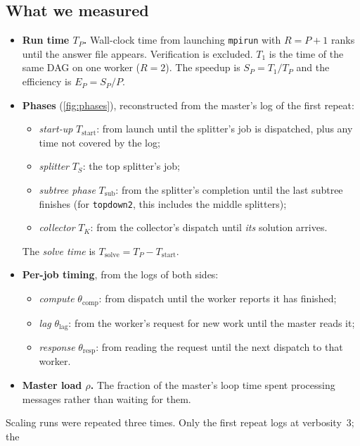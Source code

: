 \documentclass[11pt,a4paper]{article}
\newcommand{\dfam}[1]{\texttt{#1}}
\newcommand{\Tstart}{T_{\mathrm{start}}}
\newcommand{\Tsolve}{T_{\mathrm{solve}}}
\newcommand{\Tsub}{T_{\mathrm{sub}}}
\begin{document}
\subsection{What we measured}
\label{sec:metrics}
\begin{itemize}
\item \textbf{Run time $T_P$.} Wall-clock time from launching \texttt{mpirun} with
      $R=P+1$ ranks until the answer file appears. Verification is excluded. $T_1$ is the
      time of the same DAG on one worker ($R=2$). The speedup is $S_P=T_1/T_P$ and the
      efficiency is $E_P=S_P/P$.
\item \textbf{Phases} (\cref{fig:phases}), reconstructed from the master's log of the
      first repeat:
      \begin{itemize}
      \item \emph{start-up} $\Tstart$: from launch until the splitter's job is dispatched,
            plus any time not covered by the log;
      \item \emph{splitter} $T_S$: the top splitter's job;
      \item \emph{subtree phase} $\Tsub$: from the splitter's completion until the last
            subtree finishes (for \dfam{topdown2}, this includes the middle splitters);
      \item \emph{collector} $T_K$: from the collector's dispatch until \emph{its} solution
            arrives.
      \end{itemize}
      The \emph{solve time} is $\Tsolve=T_P-\Tstart$.
\item \textbf{Per-job timing}, from the logs of both sides:
      \begin{itemize}
      \item \emph{compute} $\theta_{\mathrm{comp}}$: from dispatch until the worker reports it has
            finished;
      \item \emph{lag} $\theta_{\mathrm{lag}}$: from the worker's request for new work until the
            master reads it;
      \item \emph{response} $\theta_{\mathrm{resp}}$: from reading the request until the next
            dispatch to that worker.
      \end{itemize}
\item \textbf{Master load $\rho$.} The fraction of the master's loop time spent processing
      messages rather than waiting for them.
\end{itemize}
Scaling runs were repeated three times. Only the first repeat logs at verbosity~3; the
\end{document}
